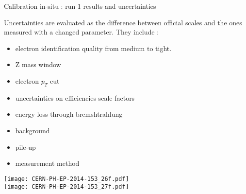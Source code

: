 \begin{frame}{Calibration in-situ : run 1  results and uncertainties}
\begin{minipage}{0.64\linewidth}
  Uncertainties are evaluated as the difference between official scales and the ones measured with a changed parameter. 
  They include :
  \begin{itemize}
  \item electron identification quality from medium to tight.
  \item Z mass window 
  \item electron $p_T$ cut
  \item uncertainties on efficiencies scale factors
  \item energy loss through bremshtrahlung
  \item background
  \item pile-up
  \item measurement method
  \end{itemize}
\end{minipage}
\begin{minipage}{0.35\linewidth}
    \texttt{[image: CERN-PH-EP-2014-153\_26f.pdf]}\\
    \texttt{[image: CERN-PH-EP-2014-153\_27f.pdf]}
\end{minipage}
\end{frame}
